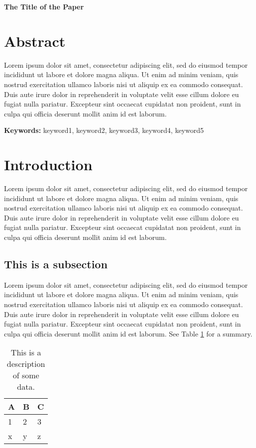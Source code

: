 \documentclass[12pt,letterpaper]{article}
\begin{document}
\centerline{\textbf{The Title of the Paper}}

\section{Abstract}
Lorem ipsum dolor sit amet, consectetur adipiscing elit, sed do eiusmod tempor incididunt ut labore et dolore magna aliqua. Ut enim ad minim veniam, quis nostrud exercitation ullamco laboris nisi ut aliquip ex ea commodo consequat. Duis aute irure dolor in reprehenderit in voluptate velit esse cillum dolore eu fugiat nulla pariatur. Excepteur sint occaecat cupidatat non proident, sunt in culpa qui officia deserunt mollit anim id est laborum.

\textbf{Keywords:} keyword1, keyword2, keyword3, keyword4, keyword5

\newpage
	
\section{Introduction}

Lorem ipsum dolor sit amet, consectetur adipiscing elit, sed do eiusmod tempor incididunt ut labore et dolore magna aliqua. Ut enim ad minim veniam, quis nostrud exercitation ullamco laboris nisi ut aliquip ex ea commodo consequat. Duis aute irure dolor in reprehenderit in voluptate velit esse cillum dolore eu fugiat nulla pariatur. Excepteur sint occaecat cupidatat non proident, sunt in culpa qui officia deserunt mollit anim id est laborum.

\subsection{This is a subsection}

Lorem ipsum dolor sit amet, consectetur adipiscing elit, sed do eiusmod tempor incididunt ut labore et dolore magna aliqua. Ut enim ad minim veniam, quis nostrud exercitation ullamco laboris nisi ut aliquip ex ea commodo consequat. Duis aute irure dolor in reprehenderit in voluptate velit esse cillum dolore eu fugiat nulla pariatur. Excepteur sint occaecat cupidatat non proident, sunt in culpa qui officia deserunt mollit anim id est laborum. See Table \ref{tab:data_table} for a summary.

\begin{table}[h]
\caption{This is a description of some data.}
\label{tab:data_table}
\centering
\begin{tabular}{|l|l|l|}
\hline
A & B & C \\ \hline \hline
1 & 2 & 3 \\ \hline
x & y & z \\ \hline
\end{tabular}
\end{table}
\end{document}
